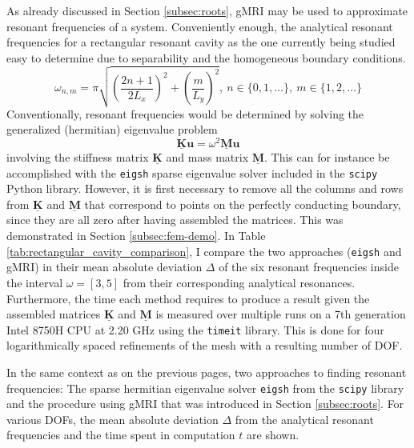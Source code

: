 \documentclass[11pt, a4paper]{article}
\begin{document}
As already discussed in Section \ref{subsec:roots}, \acrshort{gMRI} may be used
to approximate resonant frequencies of a system. Conveniently enough, the analytical
resonant frequencies for a rectangular resonant cavity as the one currently being 
studied easy to determine due to separability and the homogeneous boundary conditions. 
\begin{equation}
    \omega_{n, m} = \pi \sqrt{\left(\frac{2n + 1}{2L_x}\right)^2 + \left(\frac{m}{L_y}\right)^2},
    ~n \in \{0, 1, \dots\}, ~m \in \{1, 2, \dots \} \label{equ:analytical-eigenmodes}
\end{equation}
Conventionally, resonant frequencies would be determined by solving the generalized
(hermitian) eigenvalue problem
\begin{equation}
    \mathbf{\underline{K}} \mathbf{u} = \omega^2 \mathbf{\underline{M}} \mathbf{u}
    \label{equ:numerical-eigenmodes}
\end{equation}
involving the stiffness matrix $\mathbf{\underline{K}}$ and mass matrix $\mathbf{\underline{M}}$.
This can for instance be accomplished with the \texttt{eigsh} sparse eigenvalue
solver included in the \texttt{scipy} Python library. However, it is first necessary
to remove all the columns and rows from $\mathbf{\underline{K}}$ and $\mathbf{\underline{M}}$
that correspond to points on the perfectly conducting boundary, since they are
all zero after having assembled the matrices. This was demonstrated in Section
\ref{subsec:fem-demo}. In Table \ref{tab:rectangular_cavity_comparison}, I compare
the two approaches (\texttt{eigsh} and \acrshort{gMRI}) in their mean absolute deviation
$\Delta$ of the six resonant frequencies inside the interval $\omega = [3, 5]$ 
from their corresponding analytical resonances. Furthermore, the time each method
requires to produce a result given the assembled matrices $\mathbf{\underline{K}}$
and $\mathbf{\underline{M}}$ is measured over multiple runs on a 7th generation
Intel 8750H CPU at 2.20 GHz using the \texttt{timeit} library. This is done
for four logarithmically spaced refinements of the mesh with a resulting number
of \acrfull{DOF}.

\begin{table}[ht]
    \caption{In the same context as on the previous pages, two approaches to
    finding resonant frequencies: The sparse hermitian eigenvalue solver
    \texttt{eigsh} from the \texttt{scipy} library and the procedure using
    \acrshort{gMRI} that was introduced in Section \ref{subsec:roots}. For
    various \acrshort{DOF}s, the mean absolute deviation $\Delta$ from the analytical
    resonant frequencies and the time spent in computation $t$ are shown.}
    \label{tab:rectangular_cavity_comparison}
    
\end{table}
\end{document}
